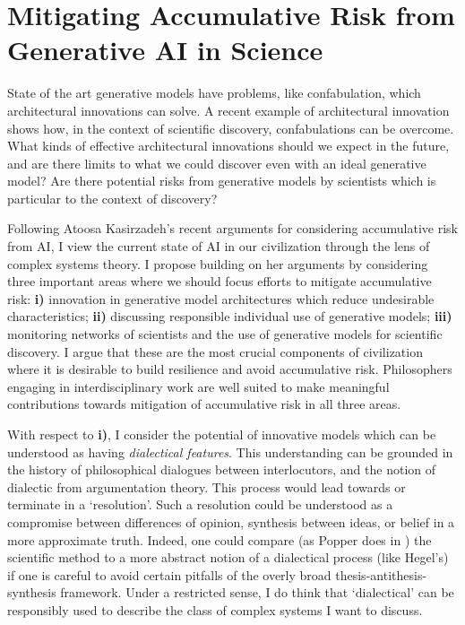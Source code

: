 \documentclass[11pt, oneside]{article}   	%
\begin{document}
\section{Mitigating Accumulative Risk from Generative AI in Science}



State of the art generative models have problems, like confabulation, which architectural innovations can solve.  A recent example of architectural innovation  \citep{FunSearch2024} shows how, in the context of scientific discovery, confabulations can be overcome.  What kinds of effective architectural innovations should we expect in the future, and are there limits to what we could discover even with an ideal generative model?  Are there potential risks from generative models by scientists which is particular to the context of discovery?

Following Atoosa Kasirzadeh’s recent arguments for considering accumulative risk from AI, I view the current state of AI in our civilization through the lens of complex systems theory. \citep{Kasirzadeh2024WIP} I propose building on her arguments by considering three important areas where we should focus efforts to mitigate accumulative risk: \textbf{i)} innovation in generative model architectures which reduce undesirable characteristics; \textbf{ii)} discussing responsible individual use of generative models; \textbf{iii)} monitoring networks of scientists and the use of generative models for scientific discovery. I argue that these are the most crucial components of civilization where it is desirable to build resilience and avoid accumulative risk. Philosophers engaging in interdisciplinary work are well suited to make meaningful contributions towards mitigation of accumulative risk in all three areas.


With respect to \textbf{i)}, I consider the potential of innovative models which can be understood as having  \emph{dialectical features}.  This understanding can be grounded in the history of philosophical dialogues between interlocutors, and the notion of dialectic from argumentation theory.  This process would lead towards or terminate in a `resolution'.  Such a resolution could be understood as a compromise between differences of opinion, synthesis between ideas, or belief in a more approximate truth.  Indeed, one could compare (as Popper does in \citep{PopperCR1963}) the scientific method to a more abstract notion of a dialectical process (like Hegel's) if one is careful to avoid certain pitfalls of the overly broad thesis-antithesis-synthesis framework. Under a restricted sense, I do think that `dialectical' can be responsibly used to describe the class of complex systems I want to discuss.
\end{document}
